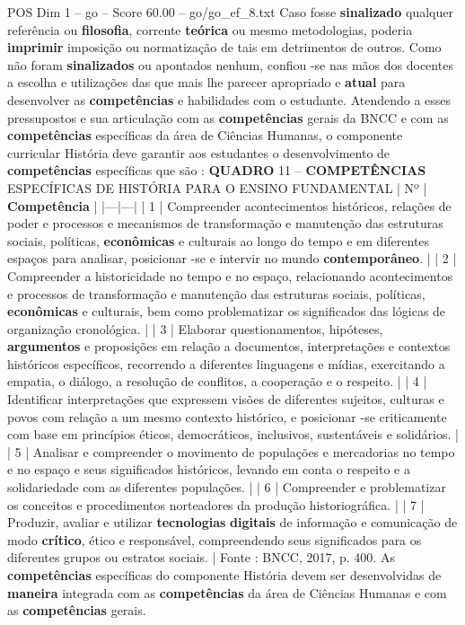 \begin{textsample}{POS Dim 1 – go – Score 60.00 – go/go\_ef\_8.txt}
Caso fosse \textbf{sinalizado} qualquer referência ou \textbf{filosofia}, corrente \textbf{teórica} ou mesmo metodologias, poderia \textbf{imprimir} imposição ou normatização de tais em detrimentos de outros.
Como não foram \textbf{sinalizados} ou apontados nenhum, confiou -se nas mãos dos docentes a escolha e utilizações das que mais lhe parecer apropriado e \textbf{atual} para desenvolver as \textbf{competências} e habilidades com o estudante.
Atendendo a esses pressupostos e sua articulação com as \textbf{competências} gerais da BNCC e com as \textbf{competências} específicas da área de Ciências Humanas, o componente curricular História deve garantir aos estudantes o desenvolvimento de \textbf{competências} específicas que são : \textbf{QUADRO} 11 – \textbf{COMPETÊNCIAS} ESPECÍFICAS DE HISTÓRIA PARA O ENSINO FUNDAMENTAL | Nº | \textbf{Competência} | |---|---| | 1 | Compreender acontecimentos históricos, relações de poder e processos e mecanismos de transformação e manutenção das estruturas sociais, políticas, \textbf{econômicas} e culturais ao longo do tempo e em diferentes espaços para analisar, posicionar -se e intervir no mundo \textbf{contemporâneo}. | | 2 | Compreender a historicidade no tempo e no espaço, relacionando acontecimentos e processos de transformação e manutenção das estruturas sociais, políticas, \textbf{econômicas} e culturais, bem como problematizar os significados das lógicas de organização cronológica. | | 3 | Elaborar questionamentos, hipóteses, \textbf{argumentos} e proposições em relação a documentos, interpretações e contextos históricos específicos, recorrendo a diferentes linguagens e mídias, exercitando a empatia, o diálogo, a resolução de conflitos, a cooperação e o respeito. | | 4 | Identificar interpretações que expressem visões de diferentes sujeitos, culturas e povos com relação a um mesmo contexto histórico, e posicionar -se criticamente com base em princípios éticos, democráticos, inclusivos, sustentáveis e solidários. | | 5 | Analisar e compreender o movimento de populações e mercadorias no tempo e no espaço e seus significados históricos, levando em conta o respeito e a solidariedade com as diferentes populações. | | 6 | Compreender e problematizar os conceitos e procedimentos norteadores da produção historiográfica. | | 7 | Produzir, avaliar e utilizar \textbf{tecnologias} \textbf{digitais} de informação e comunicação de modo \textbf{crítico}, ético e responsável, compreendendo seus significados para os diferentes grupos ou estratos sociais. | Fonte : BNCC, 2017, p. 400.
As \textbf{competências} específicas do componente História devem ser desenvolvidas de \textbf{maneira} integrada com as \textbf{competências} da área de Ciências Humanas e com as \textbf{competências} gerais.

\end{textsample}
